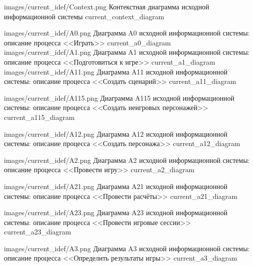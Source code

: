             {images/current_idef/Context.png}
            {Контекстная диаграмма исходной информационной системы}
            {current_context_diagram}

             {images/current_idef/A0.png}
             {Диаграмма A0 исходной информационной системы: описание процесса <<Играть>>}
             {current_a0_diagram}
             {images/current_idef/A1.png}
             {Диаграмма A1 исходной информационной системы: описание процесса <<Подготовиться к игре>>}
             {current_a1_diagram}
            {images/current_idef/A11.png}
            {Диаграмма A11 исходной информационной системы: описание процесса <<Создать сценарий>>}
            {current_a11_diagram}

            {images/current_idef/A115.png}
            {Диаграмма A115 исходной информационной системы: описание процесса <<Создать неигровых персонажей>>}
            {current_a115_diagram}

            {images/current_idef/A12.png}
            {Диаграмма A12 исходной информационной системы: описание процесса <<Создать персонажа>>}
            {current_a12_diagram}

             {images/current_idef/A2.png}
             {Диаграмма A2 исходной информационной системы: описание процесса <<Провести игру>>}
             {current_a2_diagram}

             {images/current_idef/A21.png}
             {Диаграмма A21 исходной информационной системы: описание процесса <<Провести расчёты>>}
             {current_a21_diagram}

             {images/current_idef/A23.png}
             {Диаграмма A23 исходной информационной системы: описание процесса <<Провести игровые сессии>>}
             {current_a23_diagram}

             {images/current_idef/A3.png}
             {Диаграмма A3 исходной информационной системы: описание процесса <<Определить результаты игры>>}
             {current_a3_diagram}
